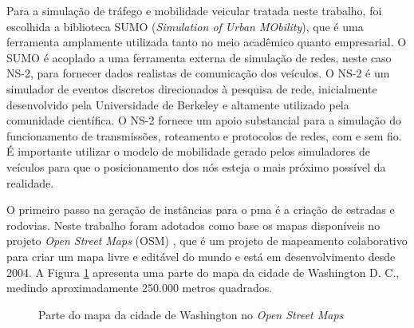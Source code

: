 Para a  simulação de tráfego e  mobilidade veicular tratada neste  trabalho, foi
escolhida a biblioteca  SUMO (\textit{Simulation of Urban MObility}),  que é uma
ferramenta amplamente  utilizada tanto no  meio acadêmico quanto  empresarial. O
SUMO é acoplado a uma ferramenta externa de simulação de redes, neste caso NS-2,
para fornecer dados realistas de comunicação dos veículos. O NS-2 é um simulador
de eventos discretos direcionados à  pesquisa de rede, inicialmente desenvolvido
pela Universidade de Berkeley e  altamente utilizado pela comunidade científica.
O  NS-2 fornece  um  apoio  substancial para  a  simulação  do funcionamento  de
transmissões, roteamento  e protocolos  de redes,  com e  sem fio.  É importante
utilizar o modelo de mobilidade gerado  pelos simuladores de veículos para que o
posicionamento dos nós esteja o mais próximo possível da realidade.

O  primeiro passo  na geração  de instâncias  para o  \gls{pma} é  a criação  de
estradas  e  rodovias.  Neste  trabalho   foram  adotados  como  base  os  mapas
disponíveis no projeto \textit{Open  Street Maps} (OSM) \cite{harklay:2008}, que
é um projeto de  mapeamento colaborativo para criar um mapa  livre e editável do
mundo e está  em desenvolvimento desde 2004.  A Figura \ref{fig:map-open-street}
apresenta  uma   parte  do  mapa  da   cidade  de  Washington  D.   C.,  medindo
aproximadamente 250.000 metros quadrados.

\begin{figure}[!ht]
    \centering
    \caption{Parte do mapa da cidade de Washington no \textit{Open Street Maps}}
    \label{fig:map-open-street}
\end{figure}

